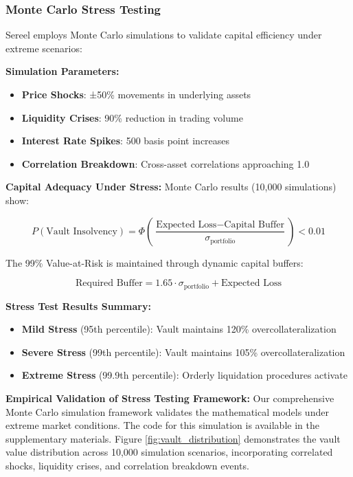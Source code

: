 \documentclass[12pt]{article}
\begin{document}
\subsubsection{Monte Carlo Stress Testing}

Sereel employs Monte Carlo simulations to validate capital efficiency under extreme scenarios:

\textbf{Simulation Parameters:}
\begin{itemize}
\item \textbf{Price Shocks}: ±50\% movements in underlying assets
\item \textbf{Liquidity Crises}: 90\% reduction in trading volume
\item \textbf{Interest Rate Spikes}: 500 basis point increases
\item \textbf{Correlation Breakdown}: Cross-asset correlations approaching 1.0
\end{itemize}

\textbf{Capital Adequacy Under Stress:}
Monte Carlo results (10,000 simulations) show:

\begin{equation}
P(\text{Vault Insolvency}) = \Phi\left(\frac{\text{Expected Loss} - \text{Capital Buffer}}{\sigma_{\text{portfolio}}}\right) < 0.01
\end{equation}

The 99\% Value-at-Risk is maintained through dynamic capital buffers:

\begin{equation}
\text{Required Buffer} = 1.65 \cdot \sigma_{\text{portfolio}} + \text{Expected Loss}
\end{equation}

\textbf{Stress Test Results Summary:}
\begin{itemize}
\item \textbf{Mild Stress} (95th percentile): Vault maintains 120\% overcollateralization
\item \textbf{Severe Stress} (99th percentile): Vault maintains 105\% overcollateralization  
\item \textbf{Extreme Stress} (99.9th percentile): Orderly liquidation procedures activate
\end{itemize}

\textbf{Empirical Validation of Stress Testing Framework:}
Our comprehensive Monte Carlo simulation framework validates the mathematical models under extreme market conditions. The code for this simulation is available in the supplementary materials. Figure \ref{fig:vault_distribution} demonstrates the vault value distribution across 10,000 simulation scenarios, incorporating correlated shocks, liquidity crises, and correlation breakdown events.
\end{document}
